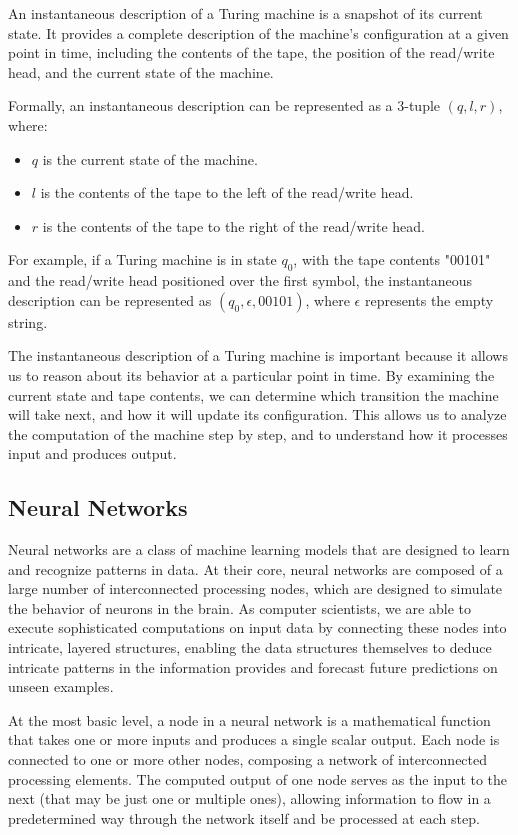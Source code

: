 \documentclass{article}
\begin{document}
An instantaneous description of a Turing machine is a snapshot of its current state. It provides a complete description of the machine's configuration at a given point in time, including the contents of the tape, the position of the read/write head, and the current state of the machine.

Formally, an instantaneous description can be represented as a 3-tuple $(q, l, r)$, where:

\begin{itemize}
    \item $q$ is the current state of the machine.
    \item $l$ is the contents of the tape to the left of the read/write head.
    \item $r$ is the contents of the tape to the right of the read/write head.
\end{itemize}

For example, if a Turing machine is in state $q_0$, with the tape contents "00101" and the read/write head positioned over the first symbol, the instantaneous description can be represented as $(q_0, \epsilon, 00101)$, where $\epsilon$ represents the empty string.

The instantaneous description of a Turing machine is important because it allows us to reason about its behavior at a particular point in time. By examining the current state and tape contents, we can determine which transition the machine will take next, and how it will update its configuration. This allows us to analyze the computation of the machine step by step, and to understand how it processes input and produces output.

\subsection{Neural Networks}

Neural networks are a class of machine learning models that are designed to learn and recognize patterns in data. At their core, neural networks are composed of a large number of interconnected processing nodes, which are designed to simulate the behavior of neurons in the brain. As computer scientists, we are able to execute sophisticated computations on input data by connecting these nodes into intricate, layered structures, enabling the data structures themselves to deduce intricate patterns in the information provides and forecast future predictions on unseen examples.

At the most basic level, a node in a neural network is a mathematical function that takes one or more inputs and produces a single scalar output. Each node is connected to one or more other nodes, composing a network of interconnected processing elements. The computed output of one node serves as the input to the next (that may be just one or multiple ones), allowing information to flow in a predetermined way through the network itself and be processed at each step.
\end{document}
